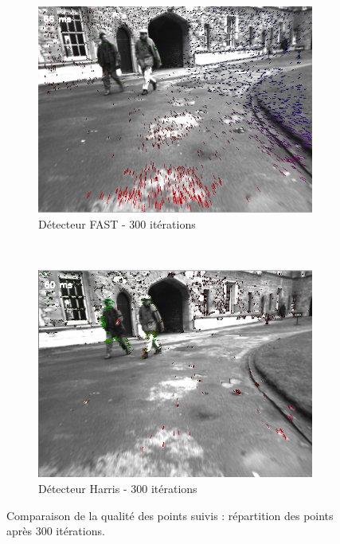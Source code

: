 \begin{figure}[h]
\begin{center}
\begin{subfigure}{0.48\textwidth}
			\includegraphics[width=\textwidth]{Chapter3/graphics/Detectors_FAST.png} 
			\caption{Détecteur FAST - 300 itérations}
		\end{subfigure}
		~
		\begin{subfigure}{0.48\textwidth}
			\includegraphics[width=\textwidth]{Chapter3/graphics/Detectors_HARRIS.png}
			 \caption{Détecteur Harris - 300 itérations}
		\end{subfigure}
		
		\caption{Comparaison de la qualité des points suivis : répartition des points après 300 itérations.}	
		\label{fig:ch3_Vision_uniformité}
	\end{center}
\end{figure}

